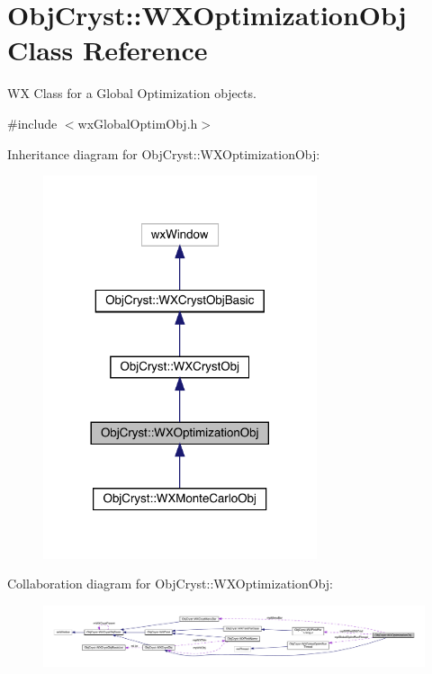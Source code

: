 \hypertarget{class_obj_cryst_1_1_w_x_optimization_obj}{}\section{Obj\+Cryst\+::W\+X\+Optimization\+Obj Class Reference}
\label{class_obj_cryst_1_1_w_x_optimization_obj}


WX Class for a Global Optimization objects.  




{\ttfamily \#include $<$wx\+Global\+Optim\+Obj.\+h$>$}



Inheritance diagram for Obj\+Cryst\+::W\+X\+Optimization\+Obj\+:
\nopagebreak
\begin{figure}[H]
\begin{center}
\leavevmode
\includegraphics[width=228pt]{class_obj_cryst_1_1_w_x_optimization_obj__inherit__graph}
\end{center}
\end{figure}


Collaboration diagram for Obj\+Cryst\+::W\+X\+Optimization\+Obj\+:
\nopagebreak
\begin{figure}[H]
\begin{center}
\leavevmode
\includegraphics[width=350pt]{class_obj_cryst_1_1_w_x_optimization_obj__coll__graph}
\end{center}
\end{figure}
